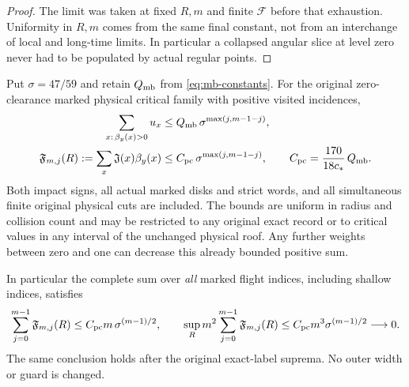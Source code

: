 \begin{proof}
The limit was taken at fixed $R,m$ and finite $\mathcal F$ before
that exhaustion. Uniformity in $R,m$ comes from the same final
constant, not from an interchange of local and long-time limits.
In particular a collapsed angular slice at level zero never had
to be populated by actual regular points.
\end{proof}

\begin{theorem}
\label{pc:fan}
Put $\sigma=47/59$ and retain $Q_{\rm mb}$ from
\eqref{eq:mb-constants}. For the original zero-clearance marked
physical critical family with positive visited incidences,
\begin{align}
 \sum_{x:\,\beta_y(x)>0}u_x
       &\le Q_{\rm mb}\,
                       \sigma^{\max(j,m-1-j)},                 \label{pc:weights}\\
 \mathfrak F_{m,j}(R):=
       \sum_x\mathfrak J(x)\beta_y(x)
       &\le C_{\rm pc}\,
                       \sigma^{\max(j,m-1-j)},\qquad
 C_{\rm pc}=\frac{170}{18c_*}\,Q_{\rm mb}.                       \label{pc:fan-bound}
\end{align}
Both impact signs, all actual marked disks and strict words, and
all simultaneous finite original physical cuts are included.
The bounds are uniform in radius and collision count and may be
restricted to any original exact record or to critical values in
any interval of the unchanged physical roof. Any further weights
between zero and one can decrease this already bounded positive sum.

In particular the complete sum over \emph{all} marked flight
indices, including shallow indices, satisfies
\begin{equation}\label{pc:all-marks}
 \sum_{j=0}^{m-1}\mathfrak F_{m,j}(R)
        \le C_{\rm pc}m\,\sigma^{(m-1)/2},\qquad
 \sup_R m^2\sum_{j=0}^{m-1}\mathfrak F_{m,j}(R)
        \le C_{\rm pc}m^3\sigma^{(m-1)/2}\longrightarrow0.
\end{equation}
The same conclusion holds after the original exact-label suprema.
No outer width or guard is changed.
\end{theorem}

